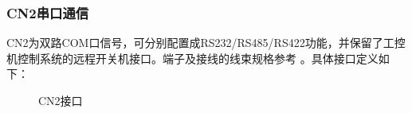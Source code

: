 \documentclass[a4paper,11pt,english,openany,oneside]{sphinxmanual}
\begin{document}
\subsubsection{CN2串口通信}
\label{\detokenize{08 _u5b89_u88c5_u4e0e_u8c03_u8bd5:cn2}}\label{\detokenize{08 _u5b89_u88c5_u4e0e_u8c03_u8bd5:id76}}
\sphinxAtStartPar
CN2为双路COM口信号，可分别配置成RS232/RS485/RS422功能，并保留了工控机控制系统的远程开关机接口。端子及接线的线束规格参考 {\hyperref[\detokenize{07 _u6280_u672f_u89c4_u683c:id9}]{}} 。具体接口定义如下：

\begin{figure}[H]
\centering
\capstart

\noindent{}
\caption{CN2接口}\label{\detokenize{08 _u5b89_u88c5_u4e0e_u8c03_u8bd5:id127}}\end{figure}
\end{document}
